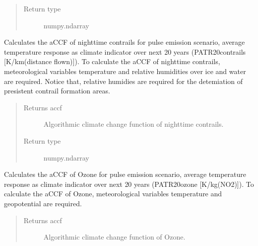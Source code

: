 \documentclass[a4paper,11pt,english]{sphinxmanual}
\begin{document}
\begin{fulllineitems}
\begin{fulllineitems}
\begin{quote}
\begin{description}
\item[{Return type}] \leavevmode
numpy.ndarray

\end{description}\end{quote}

\end{fulllineitems}


\begin{fulllineitems}
\label{\detokenize{modules:envlib.accf.GeTaCCFs.accf_ncontrail}}
Calculates the aCCF of night\sphinxhyphen{}time contrails for pulse emission scenario, average temperature response as
climate indicator over next 20 years (P\sphinxhyphen{}ATR20\sphinxhyphen{}contrails {[}K/km(distance flown){]}). To calculate the aCCF of nighttime contrails,
meteorological variables temperature and relative humidities over ice and water are required. Notice that,
relative humidies are required for the detemiation of presistent contrail formation areas.
\begin{quote}\begin{description}
\item[{Returns accf}] \leavevmode
Algorithmic climate change function of nighttime contrails.

\item[{Return type}] \leavevmode
numpy.ndarray

\end{description}\end{quote}

\end{fulllineitems}


\begin{fulllineitems}
\label{\detokenize{modules:envlib.accf.GeTaCCFs.accf_o3}}
Calculates the aCCF of Ozone for pulse emission scenario, average temperature response as climate
indicator over next 20 years (P\sphinxhyphen{}ATR20\sphinxhyphen{}ozone {[}K/kg(NO2){]}). To calculate the aCCF of Ozone, meteorological variables
temperature and geopotential are required.
\begin{quote}\begin{description}
\item[{Returns accf}] \leavevmode
Algorithmic climate change function of Ozone.


\end{description}
\end{quote}
\end{fulllineitems}
\end{fulllineitems}
\end{document}
